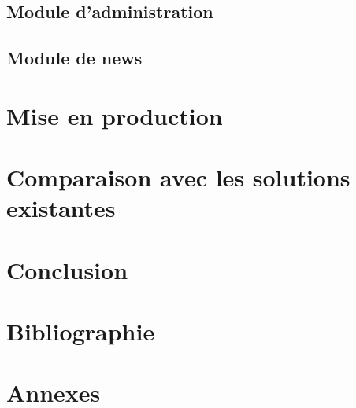 \documentclass[12pt, a4paper, oneside]{article}
\begin{document}
\subsection{Module d'administration}
\subsection{Module de news}
\section{Mise en production}
\section{Comparaison avec les solutions existantes}
\section{Conclusion}
\section{Bibliographie}
%
%
\section{Annexes}
\end{document}
